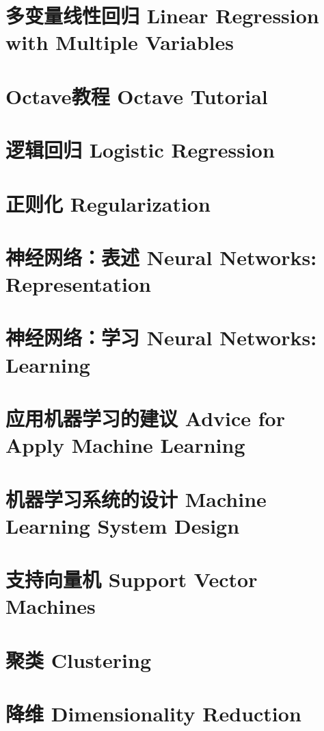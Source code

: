 \documentclass[12pt, a4paper]{article}
\begin{document}
    \section{多变量线性回归 Linear Regression with Multiple Variables}

    \section{Octave教程 Octave Tutorial}

    \section{逻辑回归 Logistic Regression}

    \section{正则化 Regularization}

    \section{神经网络：表述 Neural Networks: Representation}

    \section{神经网络：学习 Neural Networks: Learning}
    
    \section{应用机器学习的建议 Advice for Apply Machine Learning}

    \section{机器学习系统的设计 Machine Learning System Design}

    \section{支持向量机 Support Vector Machines}

    \section{聚类 Clustering}

    \section{降维 Dimensionality Reduction}
\end{document}
